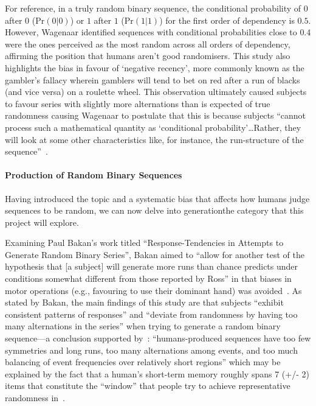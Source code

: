 For reference, in a truly random binary sequence, the conditional probability of $0$ after $0$ ($\text{Pr}(0|0)$) or $1$ after $1$ ($\text{Pr}(1|1)$) for the first order of dependency is $0.5$. However, Wagenaar identified sequences with conditional probabilities close to $0.4$ were the ones perceived as the most random across all orders of dependency, affirming the position that humans aren't good randomisers. This study also highlights the bias in favour of `negative recency', more commonly known as the gambler's fallacy wherein gamblers will tend to bet on red after a run of blacks (and vice versa) on a roulette wheel. This observation ultimately caused subjects to favour series with slightly more alternations than is expected of true randomness causing Wagenaar to postulate that this is because subjects ``cannot process such a mathematical quantity as `conditional probability'\ldots Rather, they will look at some other characteristics like, for instance, the run-structure of the sequence''~\cite{wagenaar:1970}.

\paragraph{Production of Random Binary Sequences}\label{paragraph:production_of_random_binary_sequences}
Having introduced the topic and a systematic bias that affects how humans judge sequences to be random, we can now delve into generation\textemdash{}the category that this project will explore.

Examining Paul Bakan's work titled ``Response-Tendencies in Attempts to Generate Random Binary Series'', Bakan aimed to ``allow for another test of the hypothesis that [a subject] will generate more runs than chance predicts under conditions somewhat different from those reported by Ross'' in that biases in motor operations (e.g., favouring to use their dominant hand) was avoided~\cite{bakan:1960}. As stated by Bakan, the main findings of this study are that subjects ``exhibit consistent patterns of responses'' and ``deviate from randomness by having too many alternations in the series'' when trying to generate a random binary sequence—a conclusion supported by~\cite{lopes:1987}: ``humans-produced sequences have too few symmetries and long runs, too many alternations among events, and too much balancing of event frequencies over relatively short regions'' which may be explained by the fact that a human's short-term memory roughly spans 7 (+/- 2) items that constitute the ``window'' that people try to achieve representative randomness in~\cite{kubovy:1988}.

